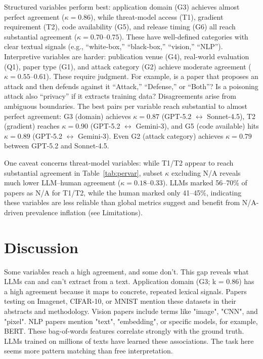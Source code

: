 \documentclass[conference,compsoc]{IEEEtran}
\begin{document}
Structured variables perform best: application domain (G3) achieves almost perfect agreement ($\kappa = 0.86$), while threat-model access (T1), gradient requirement (T2), code availability (G5), and release timing (G6) all reach substantial agreement ($\kappa = 0.70$--$0.75$). These have well-defined categories with clear textual signals (e.g., ``white-box,'' ``black-box,'' ``vision,'' ``NLP''). Interpretive variables are harder: publication venue (G4), real-world evaluation (Q1), paper type (G1), and attack category (G2) achieve moderate agreement ($\kappa = 0.55$--$0.61$). These require judgment. For example, is a paper that proposes an attack and then defends against it ``Attack,'' ``Defense,'' or ``Both''? Is a poisoning attack also ``privacy'' if it extracts training data? Disagreements arise from ambiguous boundaries. The best pairs per variable reach substantial to almost perfect agreement: G3 (domain) achieves $\kappa = 0.87$ (GPT-5.2 $\leftrightarrow$ Sonnet-4.5), T2 (gradient) reaches $\kappa = 0.90$ (GPT-5.2 $\leftrightarrow$ Gemini-3), and G5 (code available) hits $\kappa = 0.89$ (GPT-5.2 $\leftrightarrow$ Gemini-3). Even G2 (attack category) achieves $\kappa = 0.79$ between GPT-5.2 and Sonnet-4.5.

One caveat concerns threat-model variables: while T1/T2 appear to reach substantial agreement in Table~\ref{tab:pervar}, subset $\kappa$ excluding N/A reveals much lower LLM--human agreement ($\kappa = 0.18$--$0.33$). LLMs marked 56--70\% of papers as N/A for T1/T2, while the human marked only 41--45\%, indicating these variables are less reliable than global metrics suggest and benefit from N/A-driven prevalence inflation (see Limitations).

\section{Discussion}

Some variables reach a high agreement, and some don't. This gap reveals what LLMs can and can't extract from a text. Application domain (G3; k = 0.86) has a high agreement because it maps to concrete, repeated lexical signals. Papers testing on Imagenet, CIFAR-10, or MNIST mention these datasets in their abstracts and methodology. Vision papers include terms like "image", "CNN", and "pixel". NLP papers mention "text", "embedding", or specific models, for example, BERT. These bag-of-words features correlate strongly with the ground truth. LLMs trained on millions of texts have learned these associations. The task here seems more pattern matching than free interpretation.
\end{document}
